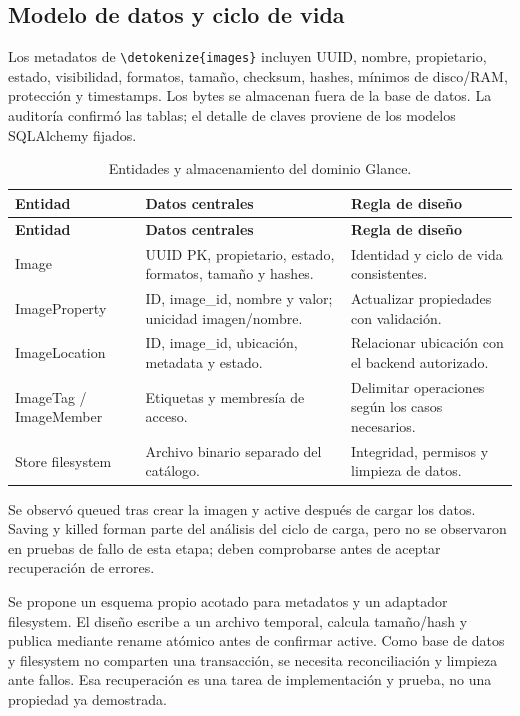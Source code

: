 \documentclass[12pt,a4paper]{article}
\newcommand{\code}[1]{{\small\expandafter\nolinkurl\expandafter{\detokenize{#1}}}}
\newcommand{\reporttable}[4]{\begingroup\small\setlength{\LTpre}{8pt}\setlength{\LTpost}{8pt}\setlength{\tabcolsep}{4pt}\renewcommand{\arraystretch}{1.15}
\begin{longtable}{#2}\caption{#1}\\\toprule #3\\\midrule\endfirsthead
\toprule #3\\\midrule\endhead\bottomrule\endfoot #4\end{longtable}\endgroup}
\begin{document}
\subsection{Modelo de datos y ciclo de vida}
Los metadatos de \code{images} incluyen UUID, nombre, propietario, estado, visibilidad, formatos, tamaño, checksum, hashes, mínimos de disco/RAM, protección y timestamps. Los bytes se almacenan fuera de la base de datos. La auditoría confirmó las tablas; el detalle de claves proviene de los modelos SQLAlchemy fijados.
\reporttable{Entidades y almacenamiento del dominio Glance.}{>{\raggedright\arraybackslash}p{3.6cm}>{\raggedright\arraybackslash}p{6.2cm}>{\raggedright\arraybackslash}p{5.2cm}}{\textbf{Entidad}&\textbf{Datos centrales}&\textbf{Regla de diseño}}{
Image&UUID PK, propietario, estado, formatos, tamaño y hashes.&Identidad y ciclo de vida consistentes.\\*
ImageProperty&ID, image\_id, nombre y valor; unicidad imagen/nombre.&Actualizar propiedades con validación.\\*
ImageLocation&ID, image\_id, ubicación, metadata y estado.&Relacionar ubicación con el backend autorizado.\\*
ImageTag / ImageMember&Etiquetas y membresía de acceso.&Delimitar operaciones según los casos necesarios.\\*
Store filesystem&Archivo binario separado del catálogo.&Integridad, permisos y limpieza de datos.\\}
Se observó queued tras crear la imagen y active después de cargar los datos. Saving y killed forman parte del análisis del ciclo de carga, pero no se observaron en pruebas de fallo de esta etapa; deben comprobarse antes de aceptar recuperación de errores.

Se propone un esquema propio acotado para metadatos y un adaptador filesystem. El diseño escribe a un archivo temporal, calcula tamaño/hash y publica mediante rename atómico antes de confirmar active. Como base de datos y filesystem no comparten una transacción, se necesita reconciliación y limpieza ante fallos. Esa recuperación es una tarea de implementación y prueba, no una propiedad ya demostrada.
\end{document}
